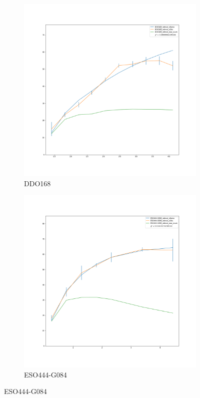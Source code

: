 \documentclass[reprint,%
 amsmath,amssymb,
 aps,
]{revtex4-1}
\begin{document}
\begin{figure}[h]
\begin{subfigure}{.5\textwidth}
  \includegraphics[width=.8\linewidth]{figures/DDO168_rotmod_XueSofue.png}
  \caption{DDO168}
  \label{fig:sfig5}
\end{subfigure}
\begin{subfigure}{.5\textwidth}
  \centering
  \includegraphics[width=.8\linewidth]{figures/ESO444-G084_rotmod_XueSofue.png}
  \caption{ESO444-G084}
  \label{fig:sfig9}
\end{subfigure}%
\end{figure}
\end{document}
